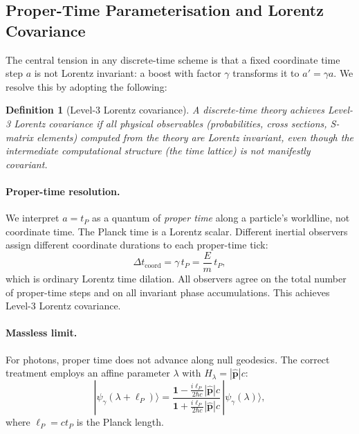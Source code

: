 \documentclass[12pt,a4paper]{article}
\newtheorem{definition}{Definition}
\begin{document}
\subsection{Proper-Time Parameterisation and Lorentz Covariance}
\label{sec:lorentz}

The central tension in any discrete-time scheme is that a fixed coordinate time step $a$
is not Lorentz invariant: a boost with factor $\gamma$ transforms it to $a' = \gamma a$.
We resolve this by adopting the following:

\begin{definition}[Level-3 Lorentz covariance]\label{def:lorentz}
A discrete-time theory achieves \emph{Level-3 Lorentz covariance} if all physical
observables (probabilities, cross sections, S-matrix elements) computed from the theory
are Lorentz invariant, even though the intermediate computational structure (the time
lattice) is not manifestly covariant.
\end{definition}

\paragraph{Proper-time resolution.}
We interpret $a = t_P$ as a quantum of \emph{proper time} along a particle's worldline,
not coordinate time.  The Planck time is a Lorentz scalar.  Different inertial observers
assign different coordinate durations to each proper-time tick:
\begin{equation}
  \Delta t_{\mathrm{coord}} = \gamma\, t_P = \frac{E}{m}\, t_P,
  \label{eq:time_dilation}
\end{equation}
which is ordinary Lorentz time dilation.  All observers agree on the total number of
proper-time steps and on all invariant phase accumulations.  This achieves Level-3 Lorentz
covariance.

\paragraph{Massless limit.}
For photons, proper time does not advance along null geodesics.  The correct treatment
employs an affine parameter $\lambda$ with $H_\lambda = |\hat{\bm{p}}|c$:
\begin{equation}
  |\psi_\gamma(\lambda + \ell_P)\rangle
  = \frac{\mathbf{1} - \tfrac{i\ell_P}{2\hbar c}|\hat{\bm{p}}|c}%
         {\mathbf{1} + \tfrac{i\ell_P}{2\hbar c}|\hat{\bm{p}}|c}
    \,|\psi_\gamma(\lambda)\rangle,
  \label{eq:photon_evolution}
\end{equation}
where $\ell_P = ct_P$ is the Planck length.
\end{document}
